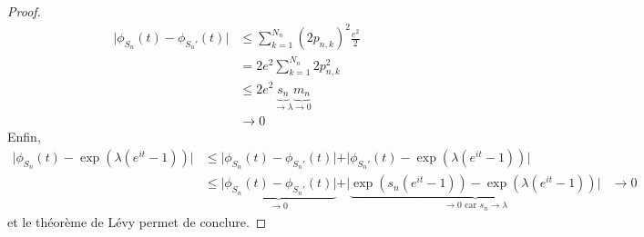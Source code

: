 \begin{proof}
\begin{align*}
      \vert \phi_{S_n}(t) - \phi_{S_n'}(t) \vert &\leq \sum_{k=1}^{N_n} (2p_{n,k})^2 \frac{e^2}{2} \\
      &= 2e^2 \sum_{k=1}^{N_n} 2p_{n,k}^2 \\
      &\leq 2e^2 \underbrace{s_n}_{\longrightarrow \lambda} \underbrace{m_n}_{\longrightarrow 0} \\
      &\longrightarrow 0
    \end{align*}
    Enfin,
    \begin{align*}
      \vert \phi_{S_n}(t) - \exp(\lambda(e^{it} - 1)) \vert &\leq \vert \phi_{S_n}(t) - \phi_{S_n'}(t) \vert + \vert \phi_{S_n'}(t) - \exp(\lambda(e^{it} - 1)) \vert \\
      &\leq \underbrace{\vert \phi_{S_n}(t) - \phi_{S_n'}(t) \vert}_{\longrightarrow 0} + \vert \underbrace{\exp(s_n(e^{it} - 1)) - \exp(\lambda(e^{it} - 1)) \vert}_{\longrightarrow 0 \text{ car } s_n \longrightarrow \lambda}
      &\longrightarrow 0
    \end{align*}
    et le théorème de Lévy permet de conclure.
  \end{proof}

